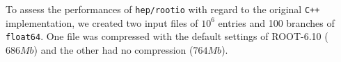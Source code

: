 \documentclass[a4paper]{jpconf}
\begin{document}
To assess the performances of \texttt{hep/rootio} with regard to the original \texttt{C++} implementation, we created two input files of $10^6$ entries and 100 branches of \texttt{float64}.
One file was compressed with the default settings of ROOT-6.10 ($686 Mb$) and the other had no compression ($764 Mb$).
\end{document}
